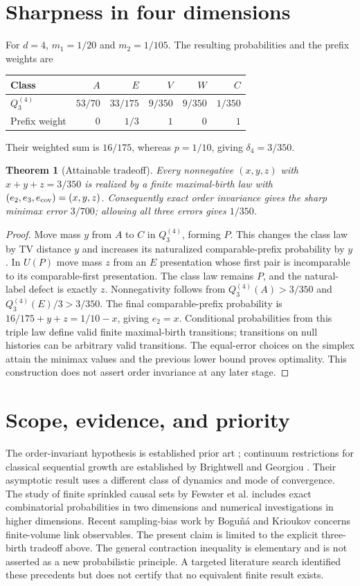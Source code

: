 \documentclass[11pt]{article}
\newtheorem{theorem}{Theorem}
\begin{document}
\section{Sharpness in four dimensions}
For $d=4$, $m_1=1/20$ and $m_2=1/105$. The resulting probabilities and the prefix weights are
\begin{center}
\begin{tabular}{lrrrrr}
\toprule
Class &$A$ &$E$ &$V$ &$W$ &$C$\\
\midrule
$Q_3^{(4)}$ &$53/70$ &$33/175$ &$9/350$ &$9/350$ &$1/350$\\
Prefix weight &$0$ &$1/3$ &$1$ &$0$ &$1$\\
\bottomrule
\end{tabular}
\end{center}
Their weighted sum is $16/175$, whereas $p=1/10$, giving $\delta_4=3/350$.
\begin{theorem}[Attainable tradeoff]
Every nonnegative $(x,y,z)$ with $x+y+z=3/350$ is realized by a finite maximal-birth law with $(e_2,e_3,e_{\rm cov})=(x,y,z)$. Consequently exact order invariance gives the sharp minimax error $3/700$; allowing all three errors gives $1/350$.
\end{theorem}
\begin{proof}
Move mass $y$ from $A$ to $C$ in $Q_3^{(4)}$, forming $P$. This changes the class law by TV distance $y$ and increases its naturalized comparable-prefix probability by $y$. In $U(P)$ move mass $z$ from an $E$ presentation whose first pair is incomparable to its comparable-first presentation. The class law remains $P$, and the natural-label defect is exactly $z$. Nonnegativity follows from $Q_3^{(4)}(A)>3/350$ and $Q_3^{(4)}(E)/3>3/350$. The final comparable-prefix probability is $16/175+y+z=1/10-x$, giving $e_2=x$. Conditional probabilities from this triple law define valid finite maximal-birth transitions; transitions on null histories can be arbitrary valid transitions. The equal-error choices on the simplex attain the minimax values and the previous lower bound proves optimality. This construction does not assert order invariance at any later stage.
\end{proof}
\section{Scope, evidence, and priority}
The order-invariant hypothesis is established prior art \cite{brightwell}; continuum restrictions for classical sequential growth are established by Brightwell and Georgiou \cite{georgiou}. Their asymptotic result uses a different class of dynamics and mode of convergence. The study of finite sprinkled causal sets by Fewster et al. \cite{fewster} includes exact combinatorial probabilities in two dimensions and numerical investigations in higher dimensions. Recent sampling-bias work by Bogu\~n\'a and Krioukov \cite{boguna} concerns finite-volume link observables. The present claim is limited to the explicit three-birth tradeoff above. The general contraction inequality is elementary and is not asserted as a new probabilistic principle. A targeted literature search identified these precedents but does not certify that no equivalent finite result exists.
\end{document}
